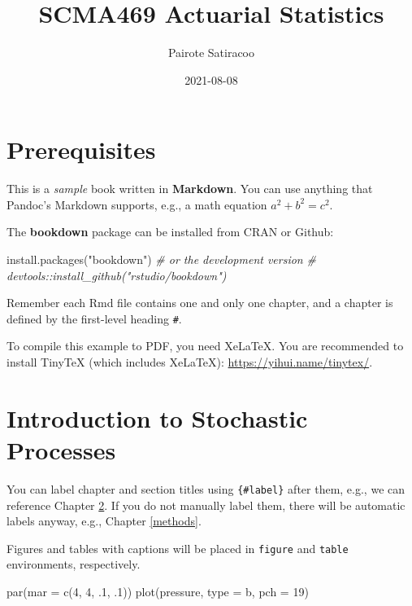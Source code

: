\documentclass[
]{book}
\title{SCMA469 Actuarial Statistics}
\author{Pairote Satiracoo}
\date{2021-08-08}
\newenvironment{Shaded}{\begin{snugshade}}{\end{snugshade}}
\newcommand{\AttributeTok}[1]{\textcolor[rgb]{0.77,0.63,0.00}{#1}}
\newcommand{\CommentTok}[1]{\textcolor[rgb]{0.56,0.35,0.01}{\textit{#1}}}
\newcommand{\DecValTok}[1]{\textcolor[rgb]{0.00,0.00,0.81}{#1}}
\newcommand{\FunctionTok}[1]{\textcolor[rgb]{0.00,0.00,0.00}{#1}}
\newcommand{\NormalTok}[1]{#1}
\newcommand{\StringTok}[1]{\textcolor[rgb]{0.31,0.60,0.02}{#1}}
\theoremstyle{definition}
\theoremstyle{definition}
\theoremstyle{definition}
\theoremstyle{definition}
\theoremstyle{remark}
\begin{document}
\maketitle

{
\setcounter{tocdepth}{1}
\tableofcontents
}
\hypertarget{prerequisites}{%
\chapter{Prerequisites}\label{prerequisites}}

This is a \emph{sample} book written in \textbf{Markdown}. You can use anything that Pandoc's Markdown supports, e.g., a math equation \(a^2 + b^2 = c^2\).

The \textbf{bookdown} package can be installed from CRAN or Github:

\begin{Shaded}
\begin{Highlighting}[]
\FunctionTok{install.packages}\NormalTok{(}\StringTok{"bookdown"}\NormalTok{)}
\CommentTok{\# or the development version}
\CommentTok{\# devtools::install\_github("rstudio/bookdown")}
\end{Highlighting}
\end{Shaded}

Remember each Rmd file contains one and only one chapter, and a chapter is defined by the first-level heading \texttt{\#}.

To compile this example to PDF, you need XeLaTeX. You are recommended to install TinyTeX (which includes XeLaTeX): \url{https://yihui.name/tinytex/}.

\hypertarget{intro}{%
\chapter{Introduction to Stochastic Processes}\label{intro}}

You can label chapter and section titles using \texttt{\{\#label\}} after them, e.g., we can reference Chapter \ref{intro}. If you do not manually label them, there will be automatic labels anyway, e.g., Chapter \ref{methods}.

Figures and tables with captions will be placed in \texttt{figure} and \texttt{table} environments, respectively.

\begin{Shaded}
\begin{Highlighting}[]
\FunctionTok{par}\NormalTok{(}\AttributeTok{mar =} \FunctionTok{c}\NormalTok{(}\DecValTok{4}\NormalTok{, }\DecValTok{4}\NormalTok{, .}\DecValTok{1}\NormalTok{, .}\DecValTok{1}\NormalTok{))}
\FunctionTok{plot}\NormalTok{(pressure, }\AttributeTok{type =} \StringTok{\textquotesingle{}b\textquotesingle{}}\NormalTok{, }\AttributeTok{pch =} \DecValTok{19}\NormalTok{)}
\end{Highlighting}
\end{Shaded}
\end{document}
